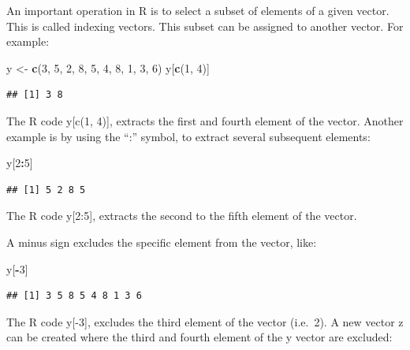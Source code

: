 \documentclass[
]{book}
\newenvironment{Shaded}{\begin{snugshade}}{\end{snugshade}}
\newcommand{\DecValTok}[1]{\textcolor[rgb]{0.00,0.00,0.81}{#1}}
\newcommand{\KeywordTok}[1]{\textcolor[rgb]{0.13,0.29,0.53}{\textbf{#1}}}
\newcommand{\NormalTok}[1]{#1}
\newcommand{\OperatorTok}[1]{\textcolor[rgb]{0.81,0.36,0.00}{\textbf{#1}}}
\newcommand{\StringTok}[1]{\textcolor[rgb]{0.31,0.60,0.02}{#1}}
\begin{document}
An important operation in R is to select a subset of elements of a given vector. This is called indexing vectors. This subset can be assigned to another vector. For example:

\begin{Shaded}
\begin{Highlighting}[]
\NormalTok{y <-}\StringTok{ }\KeywordTok{c}\NormalTok{(}\DecValTok{3}\NormalTok{, }\DecValTok{5}\NormalTok{, }\DecValTok{2}\NormalTok{, }\DecValTok{8}\NormalTok{, }\DecValTok{5}\NormalTok{, }\DecValTok{4}\NormalTok{, }\DecValTok{8}\NormalTok{, }\DecValTok{1}\NormalTok{, }\DecValTok{3}\NormalTok{, }\DecValTok{6}\NormalTok{)}
\NormalTok{y[}\KeywordTok{c}\NormalTok{(}\DecValTok{1}\NormalTok{, }\DecValTok{4}\NormalTok{)]}
\end{Highlighting}
\end{Shaded}

\begin{verbatim}
## [1] 3 8
\end{verbatim}

The R code y{[}c(1, 4){]}, extracts the first and fourth element of the vector. Another example is by using the ``:'' symbol, to extract several subsequent elements:

\begin{Shaded}
\begin{Highlighting}[]
\NormalTok{y[}\DecValTok{2}\OperatorTok{:}\DecValTok{5}\NormalTok{]}
\end{Highlighting}
\end{Shaded}

\begin{verbatim}
## [1] 5 2 8 5
\end{verbatim}

The R code y{[}2:5{]}, extracts the second to the fifth element of the vector.

A minus sign excludes the specific element from the vector, like:

\begin{Shaded}
\begin{Highlighting}[]
\NormalTok{y[}\OperatorTok{-}\DecValTok{3}\NormalTok{]}
\end{Highlighting}
\end{Shaded}

\begin{verbatim}
## [1] 3 5 8 5 4 8 1 3 6
\end{verbatim}

The R code y{[}-3{]}, excludes the third element of the vector (i.e.~2).
A new vector z can be created where the third and fourth element of the y vector are excluded:
\end{document}

